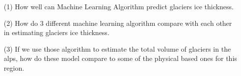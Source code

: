 %
\begin{itemize}
\item[(1)] How well can Machine Learning Algorithm predict glaciers ice thickness.
\item[(2)] How do 3 different machine learning algorithm compare with each other in estimating glaciers ice thickness.
\item[(3)] If we use those algorithm to estimate the total volume of glaciers in the alps, how do these model compare to some of the physical based ones for this region.
\end{itemize}

%
%
